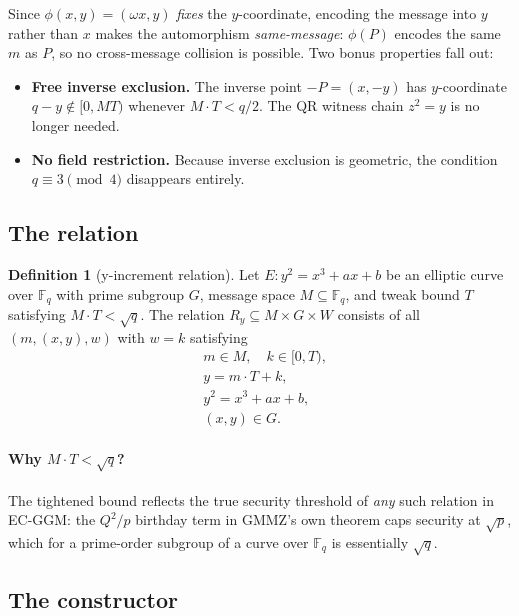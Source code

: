 \documentclass[11pt,a4paper]{article}
\theoremstyle{definition}
\newtheorem{definition}[theorem]{Definition}
\newcommand{\F}{\mathbb{F}}
\begin{document}
Since $\phi(x,y) = (\omega x, y)$ \emph{fixes} the $y$-coordinate, encoding
the message into $y$ rather than $x$ makes the automorphism
\emph{same-message}: $\phi(P)$ encodes the same $m$ as $P$, so no cross-message
collision is possible. Two bonus properties fall out:
\begin{itemize}
  \item \textbf{Free inverse exclusion.} The inverse point $-P = (x,-y)$ has
  $y$-coordinate $q - y \notin [0, MT)$ whenever $M \cdot T < q/2$. The QR
  witness chain $z^2 = y$ is no longer needed.
  \item \textbf{No field restriction.} Because inverse exclusion is
  geometric, the condition $q \equiv 3 \pmod 4$ disappears entirely.
\end{itemize}

\subsection{The relation}

\begin{definition}[y-increment relation]
\label{def:y-increment}
Let $E : y^2 = x^3 + a x + b$ be an elliptic curve over $\F_q$ with prime
subgroup $G$, message space $M \subseteq \F_q$, and tweak bound $T$
satisfying $M \cdot T < \sqrt{q}$. The relation $R_y \subseteq M \times G
\times W$ consists of all $(m,(x,y),w)$ with $w = k$ satisfying
\begin{align}
  & m \in M, \quad k \in [0,T),\\
  & y = m \cdot T + k,\\
  & y^2 = x^3 + a x + b,\\
  & (x,y) \in G.
\end{align}
\end{definition}

\paragraph{Why $M \cdot T < \sqrt{q}$?}
The tightened bound reflects the true security threshold of
\emph{any} such relation in EC-GGM: the $Q^2/p$ birthday term in GMMZ's own
theorem caps security at $\sqrt p$, which for a prime-order subgroup of a
curve over $\F_q$ is essentially $\sqrt q$.

\subsection{The constructor}
\end{document}
